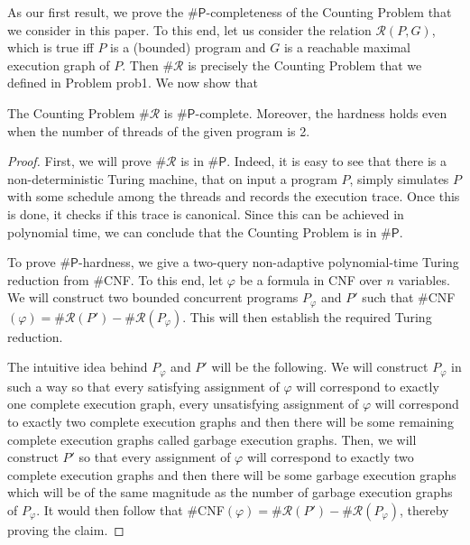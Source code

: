 \documentclass[acmsmall]{acmart}
\newcommand{\sharpP}{\#\mathsf{P}}
\begin{document}
As our first result, we prove the $\sharpP$-completeness of the Counting Problem
that we consider in this paper. To this end, let us consider the relation $\mathcal{R}(P,G)$, which is true iff $P$ is a (bounded) program and $G$ is a reachable maximal execution graph of $P$. Then $\#\mathcal{R}$ is precisely the Counting Problem that
we defined in Problem {prob1}. We now show that

\begin{theorem}
    The Counting Problem $\#\mathcal{R}$ is $\sharpP$-complete. Moreover, the hardness holds even when the number of threads of the given program is 2.
\end{theorem}

\begin{proof}
    First, we will prove $\#\mathcal{R}$ is in $\sharpP$. Indeed, it is easy to see that there is a non-deterministic Turing machine, that on input a program $P$, simply simulates $P$ with some schedule among the threads and records the execution trace. 
    Once this is done, it checks if this trace is canonical. 
    Since this can be achieved in polynomial time, we can conclude
    that the Counting Problem is in $\sharpP$.

    To prove $\sharpP$-hardness, we give a two-query non-adaptive
polynomial-time Turing reduction from $\#$CNF.
    To this end, let $\varphi$ be a formula in CNF over $n$ variables. We will construct
    two bounded concurrent programs $P_\varphi$ and $P'$ such that $\#$CNF$(\varphi) = \#\mathcal{R}(P') - \#\mathcal{R}(P_\varphi)$. This will then establish the required
    Turing reduction.

    The intuitive idea behind $P_\varphi$ and $P'$ will be the following.
    We will construct $P_\varphi$ in such a way so that  every satisfying
    assignment of $\varphi$ will correspond to exactly one complete execution graph,
    every unsatisfying assignment of $\varphi$ will correspond to exactly two
    complete execution graphs and then there will be some remaining complete execution
    graphs called garbage execution graphs. Then, we will construct $P'$ so that
    every assignment of $\varphi$ will correspond to exactly two complete execution graphs
    and then there will be some garbage execution graphs which will be of the same magnitude as the number of garbage execution graphs of $P_\varphi$. It would then follow that $\#$CNF$(\varphi) = \#\mathcal{R}(P') - \#\mathcal{R}(P_\varphi)$,
    thereby proving the claim.


\end{proof}
\end{document}
